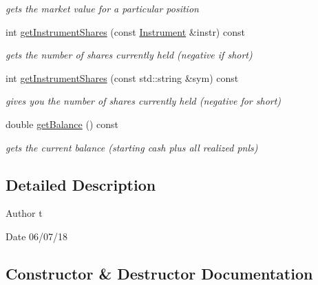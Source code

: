 \begin{DoxyCompactItemize}
\begin{DoxyCompactList}\small\item\em gets the market value for a particular position \end{DoxyCompactList}\item 
int \hyperlink{classPositionSummary_a9337188fb6f76eff2d72be77d30ac77a}{get\+Instrument\+Shares} (const \hyperlink{classInstrument}{Instrument} \&instr) const
\begin{DoxyCompactList}\small\item\em gets the number of shares currently held (negative if short) \end{DoxyCompactList}\item 
int \hyperlink{classPositionSummary_a793bab7b233e00e5110440446ba5b3be}{get\+Instrument\+Shares} (const std\+::string \&sym) const
\begin{DoxyCompactList}\small\item\em gives you the number of shares currently held (negative for short) \end{DoxyCompactList}\item 
double \hyperlink{classPositionSummary_a1c8772fe401f8d00de795ff09b856d44}{get\+Balance} () const
\begin{DoxyCompactList}\small\item\em gets the current balance (starting cash plus all realized pnls) \end{DoxyCompactList}\end{DoxyCompactItemize}


\subsection{Detailed Description}
\begin{DoxyAuthor}{Author}
t 
\end{DoxyAuthor}
\begin{DoxyDate}{Date}
06/07/18 
\end{DoxyDate}


\subsection{Constructor \& Destructor Documentation}
\mbox{\label{classPositionSummary_a466b4163900712b20ef0c24661d6fc2f}} 
